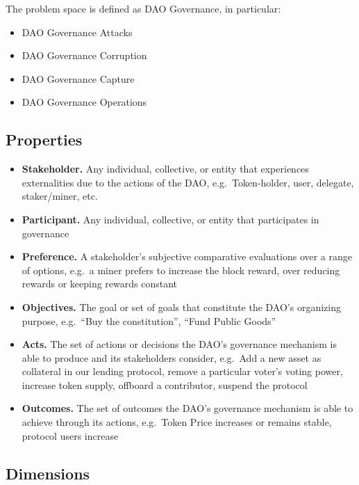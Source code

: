 \documentclass[
]{article}
\providecommand{\tightlist}{%
  \setlength{\itemsep}{0pt}\setlength{\parskip}{0pt}}
\begin{document}
The problem space is defined as DAO Governance, in particular:

\begin{itemize}
\tightlist
\item
  DAO Governance Attacks
\item
  DAO Governance Corruption
\item
  DAO Governance Capture
\item
  DAO Governance Operations
\end{itemize}

\hypertarget{properties}{%
\subsection{Properties}\label{properties}}

\begin{itemize}
\tightlist
\item
  \textbf{Stakeholder.} Any individual, collective, or entity that
  experiences externalities due to the actions of the DAO,
  e.g.~Token-holder, user, delegate, staker/miner, etc.
\item
  \textbf{Participant.} Any individual, collective, or entity that
  participates in governance
\item
  \textbf{Preference.} A stakeholder's subjective comparative
  evaluations over a range of options, e.g.~a miner prefers to increase
  the block reward, over reducing rewards or keeping rewards constant
\item
  \textbf{Objectives.} The goal or set of goals that constitute the
  DAO's organizing purpose, e.g.~``Buy the constitution'', ``Fund Public
  Goods''
\item
  \textbf{Acts.} The set of actions or decisions the DAO's governance
  mechanism is able to produce and its stakeholders consider, e.g.~Add a
  new asset as collateral in our lending protocol, remove a particular
  voter's voting power, increase token supply, offboard a contributor,
  suspend the protocol
\item
  \textbf{Outcomes.} The set of outcomes the DAO's governance mechanism
  is able to achieve through its actions, e.g.~Token Price increases or
  remains stable, protocol users increase
\end{itemize}

\hypertarget{dimensions}{%
\subsection{Dimensions}\label{dimensions}}
\end{document}
